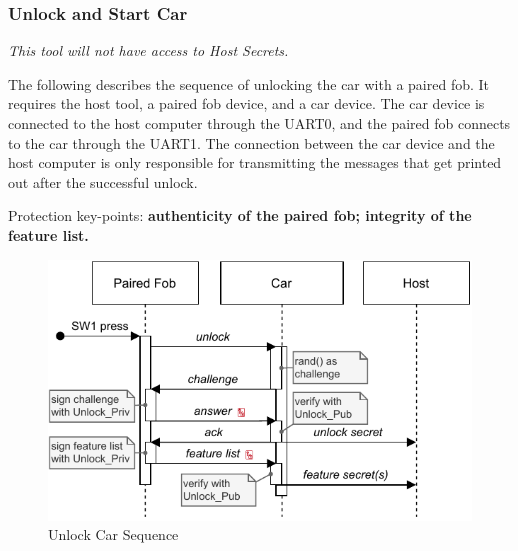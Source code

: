 \documentclass[11pt,oneside,onecolumn,letterpaper]{article}
\begin{document}
\subsubsection{Unlock and Start Car}

\textit{This tool will not have access to Host Secrets.}

The following describes the sequence of unlocking the car with a paired fob. It requires the host tool, a paired fob device, and a car device. The car device is connected to the host computer through the UART0, and the paired fob connects to the car through the UART1. The connection between the car device and the host computer is only responsible for transmitting the messages that get printed out after the successful unlock.

Protection key-points: \textbf{authenticity of the paired fob; integrity of the feature list.}

\begin{figure}[!htbp]
	\begin{centering}
		\includegraphics[width = .6\textwidth]{pic/unlock.pdf}
		\caption{Unlock Car Sequence}
		\label{fig:unlock}
	\end{centering}	
\end{figure}
\end{document}

